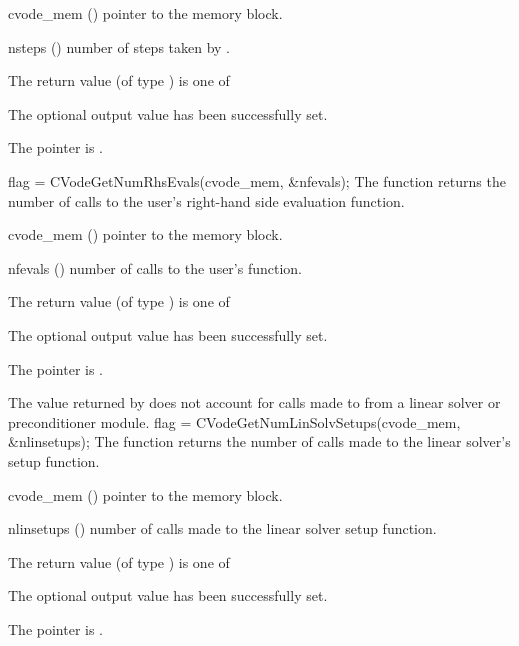 {
  \begin{args}
  \item[cvode\_mem] ()
    pointer to the {\cvode} memory block.
  \item[nsteps] ()
    number of steps taken by {\cvode}.
  \end{args}
}
{
  The return value  (of type ) is one of
  \begin{args}
  \item[\Id{CV\_SUCCESS}] 
    The optional output value has been successfully set.
  \item[\Id{CV\_MEM\_NULL}]
    The  pointer is .
  \end{args}
}
{}
{
  flag = CVodeGetNumRhsEvals(cvode\_mem, \&nfevals);
}
{
  The function  returns the 
  number of calls to the user's right-hand side evaluation function.
}
{
  \begin{args}
  \item[cvode\_mem] ()
    pointer to the {\cvode} memory block.
  \item[nfevals] ()
    number of calls to the user's  function.
  \end{args}
}
{
  The return value  (of type ) is one of
  \begin{args}
  \item[\Id{CV\_SUCCESS}] 
    The optional output value has been successfully set.
  \item[\Id{CV\_MEM\_NULL}]
    The  pointer is .
  \end{args}
}
{
  The  value returned by  does not
  account for calls made to  from a linear solver or preconditioner 
  module. 
}
{
  flag = CVodeGetNumLinSolvSetups(cvode\_mem, \&nlinsetups);
}
{
  The function  returns the
  number of calls made to the linear solver's setup function.
}
{
  \begin{args}[nlinsetups]
  \item[cvode\_mem] ()
    pointer to the {\cvode} memory block.
  \item[nlinsetups] ()
    number of calls made to the linear solver setup function.
  \end{args}
}
{
  The return value  (of type ) is one of
  \begin{args}
  \item[\Id{CV\_SUCCESS}] 
    The optional output value has been successfully set.
  \item[\Id{CV\_MEM\_NULL}]
    The  pointer is .
  \end{args}
}
